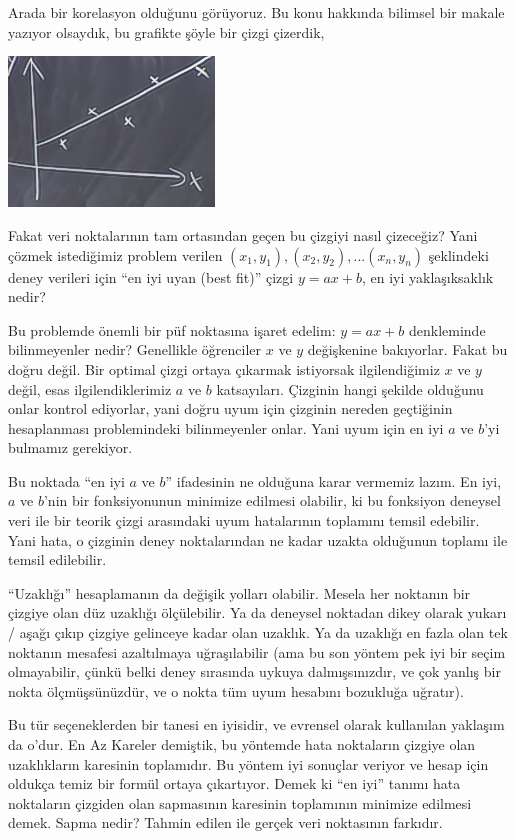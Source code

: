 \documentclass[12pt,fleqn]{article}\usepackage{../../common}
\begin{document}
Arada bir korelasyon olduğunu görüyoruz. Bu konu hakkında bilimsel bir makale
yazıyor olsaydık, bu grafikte şöyle bir çizgi çizerdik,

\begin{center}
\includegraphics[height=4cm]{9_6.png}
\end{center}

Fakat veri noktalarının tam ortasından geçen bu çizgiyi nasıl çizeceğiz?
Yani çözmek istediğimiz problem verilen $(x_1,y_1), (x_2,y_2),...(x_n,y_n)$
şeklindeki deney verileri için ``en iyi uyan (best fit)'' çizgi $y=ax + b$,
en iyi yaklaşıksaklık nedir? 

Bu problemde önemli bir püf noktasına işaret edelim: $y=ax + b$ denkleminde
bilinmeyenler nedir? Genellikle öğrenciler $x$ ve $y$ değişkenine
bakıyorlar. Fakat bu doğru değil. Bir optimal çizgi ortaya çıkarmak istiyorsak
ilgilendiğimiz $x$ ve $y$ değil, esas ilgilendiklerimiz $a$ ve $b$
katsayıları. Çizginin hangi şekilde olduğunu onlar kontrol ediyorlar, yani doğru
uyum için çizginin nereden geçtiğinin hesaplanması problemindeki bilinmeyenler
onlar. Yani uyum için en iyi $a$ ve $b$'yi bulmamız gerekiyor.

Bu noktada ``en iyi $a$ ve $b$'' ifadesinin ne olduğuna karar vermemiz
lazım. En iyi, $a$ ve $b$'nin bir fonksiyonunun minimize edilmesi olabilir,
ki bu fonksiyon deneysel veri ile bir teorik çizgi arasındaki uyum
hatalarının toplamını temsil edebilir. Yani hata, o çizginin deney
noktalarından ne kadar uzakta olduğunun toplamı ile temsil edilebilir.

``Uzaklığı'' hesaplamanın da değişik yolları olabilir. Mesela her noktanın
bir çizgiye olan düz uzaklığı ölçülebilir. Ya da deneysel noktadan dikey
olarak yukarı / aşağı çıkıp çizgiye gelinceye kadar olan uzaklık. Ya da
uzaklığı en fazla olan tek noktanın mesafesi azaltılmaya uğraşılabilir (ama
bu son yöntem pek iyi bir seçim olmayabilir, çünkü belki deney sırasında
uykuya dalmışsınızdır, ve çok yanlış bir nokta ölçmüşsünüzdür, ve o nokta
tüm uyum hesabını bozukluğa uğratır).

Bu tür seçeneklerden bir tanesi en iyisidir, ve evrensel olarak kullanılan
yaklaşım da o'dur. En Az Kareler demiştik, bu yöntemde hata noktaların
çizgiye olan uzaklıkların karesinin toplamıdır. Bu yöntem iyi sonuçlar
veriyor ve hesap için oldukça temiz bir formül ortaya çıkartıyor. Demek ki
``en iyi'' tanımı hata noktaların çizgiden olan sapmasının karesinin
toplamının minimize edilmesi demek. Sapma nedir? Tahmin edilen ile gerçek
veri noktasının farkıdır. 
\end{document}
